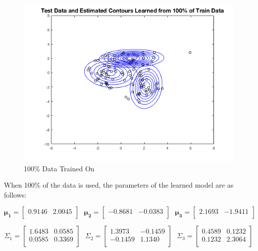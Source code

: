 \documentclass[english]{article}
\begin{document}
\begin{enumerate}
\begin{enumerate}
	\begin{figure}[H]
        \centering
    	\includegraphics[scale = 0.5]{3_1_b_100}
    	\caption{100\% Data Trained On}
    	\label{fig:3_1_b_100}
    	\end{figure}
	
	When 100\% of the data is used, the parameters of the learned model are as follows:
	
	\begin{equation*}
	\bm{\mu_1} = 
	\begin{bmatrix}
	0.9146&2.0045\\
    	\end{bmatrix}~~~
  	\bm{\mu_2} = 
    	\begin{bmatrix}
    	-0.8681&-0.0383\\
	\end{bmatrix}~~~
  	\bm{\mu_3} = 
    	\begin{bmatrix}
    	2.1693&-1.9411\\
    	\end{bmatrix}
	\end{equation*}
	
	\begin{equation*}
	\Sigma_1 = 
	\begin{bmatrix}
	1.6483&0.0585\\
	0.0585&0.3369\\
    	\end{bmatrix}~~~
  	\Sigma_2 = 
    	\begin{bmatrix}
    	1.3973&-0.1459\\
    	-0.1459&1.1340\\
	\end{bmatrix}~~~
  	\Sigma_3 = 
    	\begin{bmatrix}
    	0.4589&0.1232\\
    	0.1232&2.3064\\
    	\end{bmatrix}
	\end{equation*}
	

\end{enumerate}
\end{enumerate}
\end{document}

